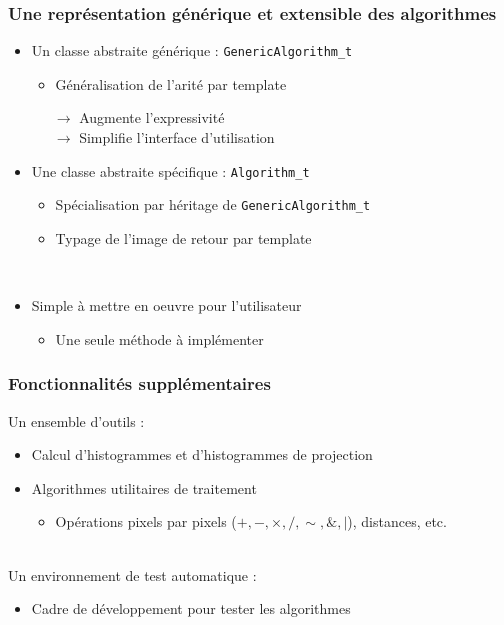 \begin{frame}
	\frametitle{Une représentation générique et extensible des algorithmes}
	\begin{itemize}
		\item Un classe abstraite générique : \texttt{GenericAlgorithm\_t}
		    \begin{itemize}
			\item Généralisation de l'arité par template
		    \end{itemize}
		    \small
		    ~~~$\longrightarrow$ Augmente l'expressivité\\
		    ~~~$\longrightarrow$ Simplifie l'interface d'utilisation
		    \normalsize
		\item Une classe abstraite spécifique : \texttt{Algorithm\_t}\\
		    \begin{itemize}
		    \item Spécialisation par héritage de \texttt{GenericAlgorithm\_t}
		    \item Typage de l'image de retour par template
		    \end{itemize}
       \tiny ~\\ \normalsize
    \item Simple à mettre en oeuvre pour l'utilisateur
        \begin{itemize}
            \item Une seule méthode à implémenter
        \end{itemize}
	\end{itemize}
\end{frame}

\begin{frame}
	\frametitle{Fonctionnalités supplémentaires}
	Un ensemble d'outils :
	\begin{itemize}
  
		\item Calcul d'histogrammes et d'histogrammes de projection
		\item Algorithmes utilitaires de traitement
		\begin{itemize}
		    \item Opérations pixels par pixels ($+,-,\times,/,\sim,\&,|$), distances, etc.
		\end{itemize}
	\end{itemize}
  ~\\

	Un environnement de test automatique :
	\begin{itemize}
	    \item Cadre de développement pour tester les algorithmes 
	\end{itemize}
\end{frame}

